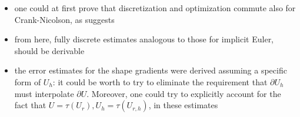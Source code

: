 \documentclass[english,a4paper,9pt,oneside]{scrbook}	%
\theoremstyle{break}
\theoremstyle{remark}
\begin{document}
\begin{itemize}
	\item one could at first prove that discretization and optimization commute also for Crank-Nicolson, as \cite{flaig} suggests
	\item from here, fully discrete estimates analogous to those for implicit Euler, should be derivable
	\item the error estimates for the shape gradients were derived assuming a specific form of $U_h$: it could be worth to try to eliminate the requirement that $\partial U_h$ must interpolate $\partial U$. Moreover, one could try to explicitly account for the fact that $U=\tau (U_r), U_h = \tau(U_{r,h})$, in these estimates
\end{itemize}
%
\renewcommand\chaptername{Appendix}
\end{document}
